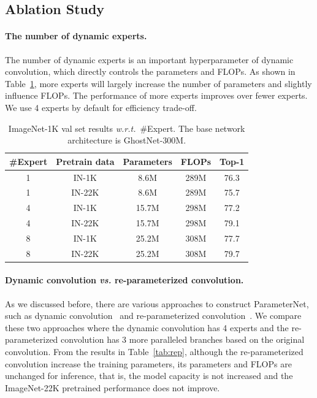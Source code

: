 \documentclass{article}
\newcommand{\wrt}{\emph{w.r.t.}}
\begin{document}
\subsection{Ablation Study}
\paragraph{The number of dynamic experts.}
The number of dynamic experts is an important hyperparameter of dynamic convolution, which directly controls the parameters and FLOPs. As shown in Table~\ref{tab:expert}, more experts will largely increase the number of parameters and slightly influence FLOPs. The performance of more experts improves over fewer experts. We use 4 experts by default for efficiency trade-off.

\begin{table}[htb]
	\centering
	\renewcommand\arraystretch{1.05}
	\caption{ImageNet-1K val set results \wrt~\#Expert. The base network architecture is GhostNet-300M.}
	\label{tab:expert}
	\begin{tabular}{c|c|ccc}
		\hline
		\#Expert & Pretrain data  & Parameters & FLOPs & Top-1  \\
		\hline
		1 & IN-1K &  8.6M & 289M & 76.3 \\
		1 & IN-22K &  8.6M & 289M & 75.7 \\
		4 & IN-1K &  15.7M & 298M & 77.2 \\
		4 & IN-22K &  15.7M & 298M & 79.1 \\
		8 & IN-1K &  25.2M & 308M & 77.7 \\
		8 & IN-22K &  25.2M & 308M & 79.7 \\
		\hline
	\end{tabular}	
\end{table}

\paragraph{Dynamic convolution \emph{vs.} re-parameterized convolution.}
As we discussed before, there are various approaches to construct ParameterNet, such as dynamic convolution~\cite{dynamic-conv} and re-parameterized convolution~\cite{repvgg}. We compare these two approaches where the dynamic convolution has 4 experts and the re-parameterized convolution has 3 more paralleled branches based on the original convolution. From the results in Table~\ref{tab:rep}, although the re-parameterized convolution increase the training parameters, its parameters and FLOPs are unchanged for inference, that is, the model capacity is not increased and the ImageNet-22K pretrained performance does not improve.
\end{document}
